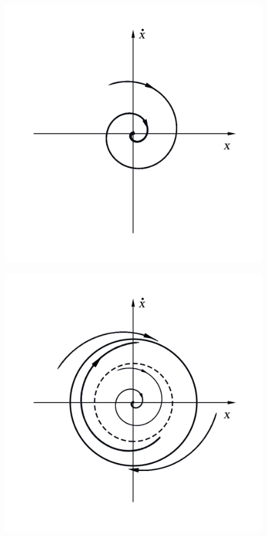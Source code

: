 \begin{center}
\vspace{-20pt}
    \begin{figure}[h!]
        \begin{minipage}{0.32\linewidth}
            \includegraphics[width=\linewidth]{photo/pics/Ris10a.png}
            \vspace{-30pt}
            \label{fig:10}
        \end{minipage}
    \begin{minipage}{0.32\linewidth}
        \includegraphics[width=\linewidth]{photo/pics/Ris10b.png}

\end{minipage}
\end{figure}
\end{center}
